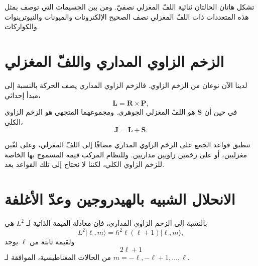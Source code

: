 تشكل هاتان الحالتان ثنائية اللفّ المغزلي نصفيّ. ومن بين الجسيمات التي توصف بمثل هذه المتعددات ذات اللفّ المغزلي نصف الصحيح الإلكترونات والميونات والنيوترينوات والكواركات.

\section{الزخم الزاوي المداري واللفّ المغزلي}

لدينا الآن نوعان من الزخم الزاوي. فالزخم الزاوي المداري يصف الحركة بالنسبة إلى مبدأ إحداثي،
\begin{equation}
\mathbf L=\mathbf R\times\mathbf P,
\end{equation}
في حين أن \(\mathbf S\) هو اللفّ المغزلي الجوهري. ومجموعهما المتجهي هو الزخم الزاوي الكلي،
\begin{equation}
\mathbf J=\mathbf L+\mathbf S.
\end{equation}

\begin{classroomqa}
\end{classroomqa}

تنطبق قواعد الجمع على الزخم الزاوي المداري مضافًا إلى اللفّ المغزلي، وعلى لفّين مغزليين، أو على زخمين زاويين مداريين. وللنظام المركب قيمه المسموح بها الخاصة للزخم الزاوي الكلي، لكننا لا نحتاج إلى تلك القواعد بعد.

\begin{classroomqa}
\end{classroomqa}

\section{الانحلال الشبيه بالهيدروجين وعدّ الأغلفة}

بالنسبة إلى الزخم الزاوي المداري، فإن معادلة القيمة الذاتية لـ \(L^{2}\) هي
\begin{equation}
L^{2}\lvert\ell,m\rangle
=\hbar^{2}\ell(\ell+1)\lvert\ell,m\rangle,
\end{equation}
ولقيمة ثابتة من \(\ell\) يوجد
\begin{equation}
2\ell+1
\end{equation}
من الحالات المغناطيسية، الموافقة لـ \(m=-\ell,-\ell+1,\ldots,\ell\).

